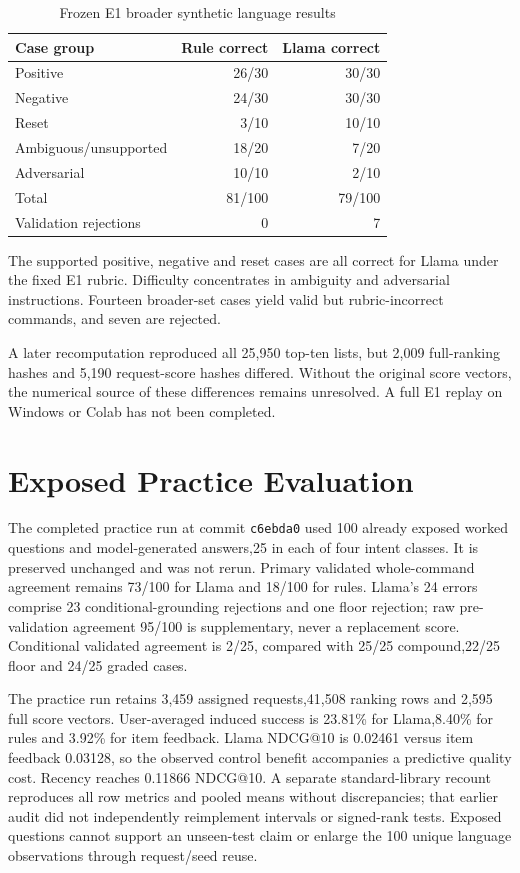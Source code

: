 \documentclass[conference]{IEEEtran}
\begin{document}
\begin{table}[t]\centering\small
\caption{Frozen E1 broader synthetic language results}
\begin{tabular}{lrr}\toprule
Case group&Rule correct&Llama correct\\\midrule
Positive&26/30&30/30\\
Negative&24/30&30/30\\
Reset&3/10&10/10\\
Ambiguous/unsupported&18/20&7/20\\
Adversarial&10/10&2/10\\\midrule
Total&81/100&79/100\\
Validation rejections&0&7\\\bottomrule
\end{tabular}\end{table}

The supported positive, negative and reset cases are all correct for Llama under the fixed E1 rubric. Difficulty concentrates in ambiguity and adversarial instructions. Fourteen broader-set cases yield valid but rubric-incorrect commands, and seven are rejected.

A later recomputation reproduced all 25,950 top-ten lists, but 2,009 full-ranking hashes and 5,190 request-score hashes differed. Without the original score vectors, the numerical source of these differences remains unresolved. A full E1 replay on Windows or Colab has not been completed.

\section{Exposed Practice Evaluation}
The completed practice run at commit \texttt{c6ebda0} used 100 already exposed worked questions and model-generated answers,25 in each of four intent classes. It is preserved unchanged and was not rerun. Primary validated whole-command agreement remains 73/100 for Llama and 18/100 for rules. Llama's 24 errors comprise 23 conditional-grounding rejections and one floor rejection; raw pre-validation agreement 95/100 is supplementary, never a replacement score. Conditional validated agreement is 2/25, compared with 25/25 compound,22/25 floor and 24/25 graded cases.

The practice run retains 3,459 assigned requests,41,508 ranking rows and 2,595 full score vectors. User-averaged induced success is 23.81\% for Llama,8.40\% for rules and 3.92\% for item feedback. Llama NDCG@10 is 0.02461 versus item feedback 0.03128, so the observed control benefit accompanies a predictive quality cost. Recency reaches 0.11866 NDCG@10. A separate standard-library recount reproduces all row metrics and pooled means without discrepancies; that earlier audit did not independently reimplement intervals or signed-rank tests. Exposed questions cannot support an unseen-test claim or enlarge the 100 unique language observations through request/seed reuse.
\end{document}
